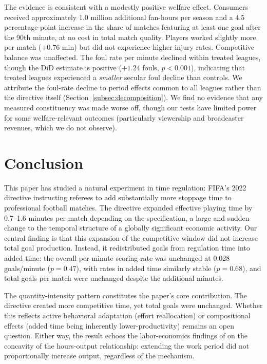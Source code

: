 \documentclass[12pt]{article}
\begin{document}
The evidence is consistent with a modestly positive welfare effect.
Consumers received approximately 1.0 million additional fan-hours per season and
a 4.5 percentage-point increase in the share of matches featuring at least one goal after the 90th minute, at no
cost in total match quality. Players worked slightly more per match ($+0.76$ min)
but did not experience higher injury rates. Competitive balance was unaffected.
The foul rate per minute declined within treated leagues, though the DiD estimate is positive ($+1.24$ fouls, $p < 0.001$), indicating that treated leagues experienced a \emph{smaller} secular foul decline than controls. We attribute the foul-rate decline to period effects common to all leagues rather than the directive itself (Section~\ref{subsec:decomposition}).
We find no evidence that any measured constituency was made worse off, though
our tests have limited power for some welfare-relevant outcomes
(particularly viewership and broadcaster revenues, which we do not
observe).


\section{Conclusion}
\label{sec:conclusion}

This paper has studied a natural experiment in time regulation: FIFA's
2022 directive instructing referees to add substantially more stoppage
time to professional football matches. The directive expanded effective
playing time by 0.7--1.6 minutes per match depending on the specification,
a large and sudden change to the temporal structure of a globally
significant economic activity. Our central finding is that this expansion
of the competitive window did not increase total goal production. Instead,
it redistributed goals from regulation time into added time: the overall per-minute
scoring rate was unchanged at 0.028 goals/minute ($p = 0.47$), with rates in added time
similarly stable ($p = 0.68$), and total goals per match were unchanged despite the additional minutes.

The quantity-intensity pattern constitutes the paper's core contribution.
The directive created more competitive time, yet total goals were unchanged.
Whether this reflects active behavioral adaptation (effort reallocation) or
compositional effects (added time being inherently lower-productivity) remains
an open question. Either way, the result echoes the labor-economics findings of
\citet{pencavel2015effects} on the concavity of the hours-output
relationship: extending the work period did not proportionally increase
output, regardless of the mechanism.
\end{document}

